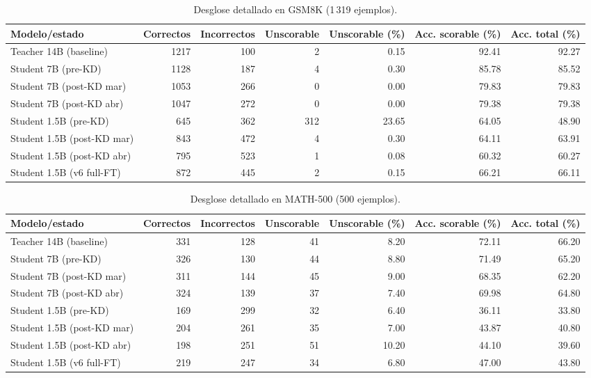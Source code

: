 \documentclass[11pt,a4paper]{article}
\begin{document}
\begin{table}[H]
\centering
\caption{Desglose detallado en GSM8K (1\,319 ejemplos).}
\label{tab:parseability-gsm8k}
\begin{adjustbox}{max width=\textwidth}
\begin{tabular}{lrrrrrr}
\toprule
\textbf{Modelo/estado} & \textbf{Correctos} & \textbf{Incorrectos} & \textbf{Unscorable} & \textbf{Unscorable (\%)} & \textbf{Acc. scorable (\%)} & \textbf{Acc. total (\%)} \\
\midrule
Teacher 14B (baseline)      & 1217 & 100 & 2   & 0.15  & 92.41 & 92.27 \\
Student 7B (pre-KD)         & 1128 & 187 & 4   & 0.30  & 85.78 & 85.52 \\
Student 7B (post-KD mar)    & 1053 & 266 & 0   & 0.00  & 79.83 & 79.83 \\
Student 7B (post-KD abr)    & 1047 & 272 & 0   & 0.00  & 79.38 & 79.38 \\
Student 1.5B (pre-KD)       & 645  & 362 & 312 & 23.65 & 64.05 & 48.90 \\
Student 1.5B (post-KD mar)  & 843  & 472 & 4   & 0.30  & 64.11 & 63.91 \\
Student 1.5B (post-KD abr)  & 795  & 523 & 1   & 0.08  & 60.32 & 60.27 \\
Student 1.5B (v6 full-FT)    & 872  & 445 & 2   & 0.15  & 66.21 & 66.11 \\
\bottomrule
\end{tabular}
\end{adjustbox}
\end{table}

\begin{table}[H]
\centering
\caption{Desglose detallado en MATH-500 (500 ejemplos).}
\label{tab:parseability-math}
\begin{adjustbox}{max width=\textwidth}
\begin{tabular}{lrrrrrr}
\toprule
\textbf{Modelo/estado} & \textbf{Correctos} & \textbf{Incorrectos} & \textbf{Unscorable} & \textbf{Unscorable (\%)} & \textbf{Acc. scorable (\%)} & \textbf{Acc. total (\%)} \\
\midrule
Teacher 14B (baseline)      & 331 & 128 & 41 & 8.20  & 72.11 & 66.20 \\
Student 7B (pre-KD)         & 326 & 130 & 44 & 8.80  & 71.49 & 65.20 \\
Student 7B (post-KD mar)    & 311 & 144 & 45 & 9.00  & 68.35 & 62.20 \\
Student 7B (post-KD abr)    & 324 & 139 & 37 & 7.40  & 69.98 & 64.80 \\
Student 1.5B (pre-KD)       & 169 & 299 & 32 & 6.40  & 36.11 & 33.80 \\
Student 1.5B (post-KD mar)  & 204 & 261 & 35 & 7.00  & 43.87 & 40.80 \\
Student 1.5B (post-KD abr)  & 198 & 251 & 51 & 10.20 & 44.10 & 39.60 \\
Student 1.5B (v6 full-FT)    & 219 & 247 & 34 & 6.80  & 47.00 & 43.80 \\
\bottomrule
\end{tabular}
\end{adjustbox}
\end{table}
\end{document}
